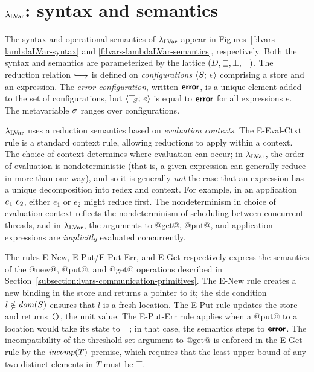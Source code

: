 \section{$\lambda_{\textrm{LVar}}$: syntax and semantics}\label{s:lvars-lambdalvar}

\FigLambdaLVarGrammar

\FigLambdaLVarSemantics


The syntax and operational semantics of $\lambda_{\textrm{LVar}}$ appear in
Figures~\ref{f:lvars-lambdaLVar-syntax} and
\ref{f:lvars-lambdaLVar-semantics}, respectively.  Both the syntax and
semantics are parameterized by the lattice $(D, \sqsubseteq, \bot,
\top)$.  The reduction relation $\parstepsto$ is defined on
\emph{configurations} $\langle S;\, e \rangle$ comprising a store and an
expression.  The \emph{error configuration}, written $\textbf{\textsf{error}}$, is a
unique element added to the set of configurations, but
$\langle \top\hspace{-0.85mm}_{S};\, e \rangle$ is equal to $\textbf{\textsf{error}}$ for all expressions $e$.  The
metavariable $\sigma$ ranges over configurations.

$\lambda_{\textrm{LVar}}$ uses a reduction semantics based on \emph{evaluation
  contexts}.  The {\sc E-Eval-Ctxt} rule is a standard context rule,
allowing reductions to apply within a context.  The choice of context
determines where evaluation can occur; in $\lambda_{\textrm{LVar}}$, the order of
evaluation is nondeterministic (that is, a given expression can
generally reduce in more than one way), and so it is generally
\emph{not} the case that an expression has a unique decomposition into
redex and context.  For example, in an application $e_1~e_2$,
either $e_1$ or $e_2$ might reduce first.  The nondeterminism in
choice of evaluation context reflects the nondeterminism of scheduling
between concurrent threads, and in $\lambda_{\textrm{LVar}}$, the arguments to
@get@, @put@, and application expressions are \emph{implicitly}
evaluated concurrently.

The rules {\sc E-New}, {\sc E-Put}/{\sc E-Put-Err}, and {\sc E-Get}
respectively express the semantics of the @new@, @put@, and @get@
operations described in
Section~\ref{subsection:lvars-communication-primitives}.  The {\sc
  E-New} rule creates a new binding in the store and returns a pointer
to it; the side condition $l \notin \mathit{dom}(S)$ ensures that $l$ is a
fresh location.  The {\sc E-Put} rule updates the store and returns
$\mbox{\texttt{()}}$, the unit value.  The {\sc E-Put-Err} rule applies when a
@put@ to a location would take its state to $\top$; in that case, the
semantics steps to $\textbf{\textsf{error}}$.  The incompatibility of the threshold set
argument to @get@ is enforced in the {\sc E-Get} rule by the
$\mathit{incomp}(T)$ premise, which requires that the least upper bound of any
two distinct elements in $T$ must be $\top$.


